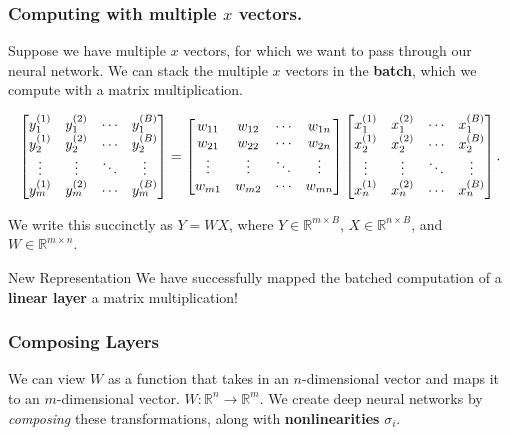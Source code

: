\documentclass[main.tex]{subfiles}
\begin{document}
\begin{frame}
  \frametitle{Computing with multiple \(x\) vectors.}
  Suppose we have multiple \(x\) vectors, for which we want to pass through our
  neural network. We can stack the multiple \(x\) vectors in the \textbf{batch},
  which we compute with a matrix multiplication.

  \pause
  \[
    \resizebox{\textwidth}{!}{$\displaystyle
      \begin{bmatrix}
        y_1^{(1)} & y_1^{(2)} & \cdots & y_1^{(B)} \\
        y_2^{(1)} & y_2^{(2)} & \cdots & y_2^{(B)} \\
        \vdots & \vdots & \ddots & \vdots \\
        y_m^{(1)} & y_m^{(2)} & \cdots & y_m^{(B)}
      \end{bmatrix}
      =
      \begin{bmatrix}
        w_{11} & w_{12} & \cdots & w_{1n} \\
        w_{21} & w_{22} & \cdots & w_{2n} \\
        \vdots & \vdots & \ddots & \vdots \\
        w_{m1} & w_{m2} & \cdots & w_{mn}
      \end{bmatrix}
      \begin{bmatrix}
        x_1^{(1)} & x_1^{(2)} & \cdots & x_1^{(B)} \\
        x_2^{(1)} & x_2^{(2)} & \cdots & x_2^{(B)} \\
        \vdots & \vdots & \ddots & \vdots \\
        x_n^{(1)} & x_n^{(2)} & \cdots & x_n^{(B)}
      \end{bmatrix}.
    $}
  \]

  \pause We write this succinctly as \(Y = WX\), where \(Y \in \mathbb{R}^{m \times B}\),
  \(X \in \mathbb{R}^{n \times B}\), and \(W \in \mathbb{R}^{m \times n}\).

  \pause
  \begin{alertblock}{New Representation}
    We have successfully mapped the batched computation of a \textbf{linear layer}
    a matrix multiplication!
  \end{alertblock}
\end{frame}

\begin{frame}
  \frametitle{Composing Layers}

  We can view \(W\) as a function that takes in an \(n\)-dimensional vector and
  maps it to an \(m\)-dimensional vector. \(W \colon \mathbb{R}^n \rightarrow \mathbb{R}^m\).
  We create deep neural networks by \emph{composing} these transformations, along
  with  \textbf{nonlinearities} \(\sigma_i\).

  

\end{frame}
\end{document}
